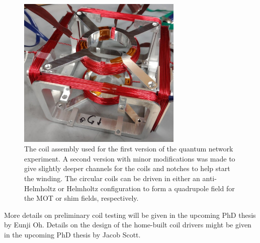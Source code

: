 \begin{figure}[h!]
    \centering
    \includegraphics[width=0.7\textwidth]{Images/node1_coils.pdf}
    \caption{The coil assembly used for the first version of the quantum network experiment. A second version with minor modifications was made to give slightly deeper channels for the coils and notches to help start the winding. The circular coils can be driven in either an anti-Helmholtz or Helmholtz configuration to form a quadrupole field for the MOT or shim fields, respectively.}
    \label{fig:node1_coils.pdf}
\end{figure}

More details on preliminary coil testing will be given in the upcoming PhD thesis by Eunji Oh. Details on the design of the home-built coil drivers might be given in the upcoming PhD thesis by Jacob Scott. 





